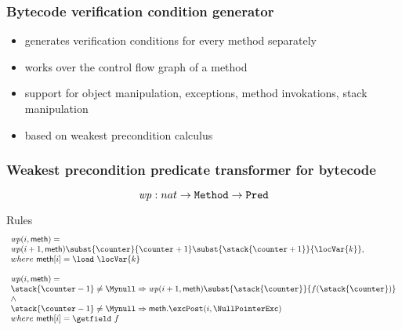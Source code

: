 \documentclass{beamer}
\begin{document}
\begin{frame}
\frametitle{Bytecode verification condition generator}
\begin{itemize}
   \item generates verification conditions for every method separately
   \item works over the control flow graph of a method
   \item support for object manipulation, exceptions, method invokations, stack manipulation
   \item based on weakest precondition calculus
\end{itemize}
 \end{frame}



\begin{frame}\frametitle{Weakest precondition predicate transformer for bytecode}
\begin{definition}
   $$\mbox{\rm\textit{wp}}:  nat \rightarrow \mbox{\rm\texttt{Method}}  \rightarrow \mbox{\rm\texttt{Pred}} $$
\end{definition}

\begin{block}{Rules}
   $$ \begin{array}{l}
        \wpi(i,\methodd ) = \\
         \wpi(i+1,\methodd)\subst{\counter}{\counter+1} \subst{\stack{\counter + 1}}{\locVar{k}}, \\
	  where \  \methodd[i] = \load \  \locVar{k} \\
	\\
	\wpi(i,\methodd ) = \\
       \stack{\counter - 1} \neq \Mynull \Rightarrow 
                            \wpi(i+1,\methodd)\subst{\stack{\counter}}{f(\stack{\counter} )} \\
			    \wedge \\ 
			     \stack{\counter - 1} \neq \Mynull \Rightarrow \methodd.\excPost( i, \NullPointerExc) \\
	  where \  \methodd[i] = \getfield \ f  \\
      \end{array}$$
\end{block}
\end{frame}
\end{document}
